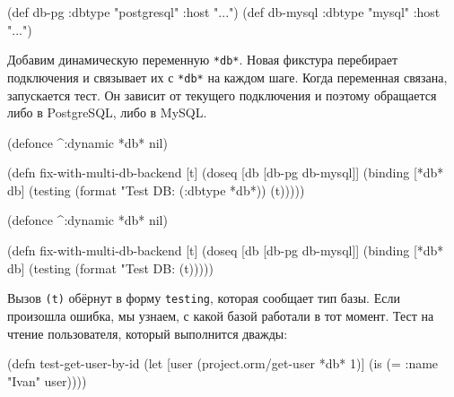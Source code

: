 \else

\begin{english}
  \begin{clojure}
(def db-pg    {:dbtype "postgresql" :host "..."})
(def db-mysql {:dbtype "mysql"      :host "..."})
  \end{clojure}
\end{english}

\fi

Добавим динамическую переменную \verb|*db*|. Новая фикстура перебирает
подключения и связывает их с \verb|*db*| на каждом шаге. Когда переменная
связана, запускается тест. Он зависит от текущего подключения и поэтому
обращается либо в PostgreSQL, либо в MySQL.

\ifnarrow

\begin{english}
  \begin{clojure}
(defonce ^:dynamic *db* nil)

(defn fix-with-multi-db-backend [t]
  (doseq [db [db-pg db-mysql]]
    (binding [*db* db]
      (testing
        (format "Test DB: %
          (:dbtype *db*))
        (t)))))
  \end{clojure}
\end{english}

\else

\begin{english}
  \begin{clojure}
(defonce ^:dynamic *db* nil)

(defn fix-with-multi-db-backend [t]
  (doseq [db [db-pg db-mysql]]
    (binding [*db* db]
      (testing (format "Test DB: %
        (t)))))
  \end{clojure}
\end{english}

\fi

Вызов \verb|(t)| обёрнут в форму \verb|testing|, которая сообщает тип базы. Если
произошла ошибка, мы узнаем, с какой базой работали в тот момент. Тест на чтение
пользователя, который выполнится дважды:

\ifnarrow

\begin{english}
  \begin{clojure}
(defn test-get-user-by-id
  (let [user
        (project.orm/get-user *db* 1)]
    (is (= {:name "Ivan"} user))))
  \end{clojure}
\end{english}

\else

